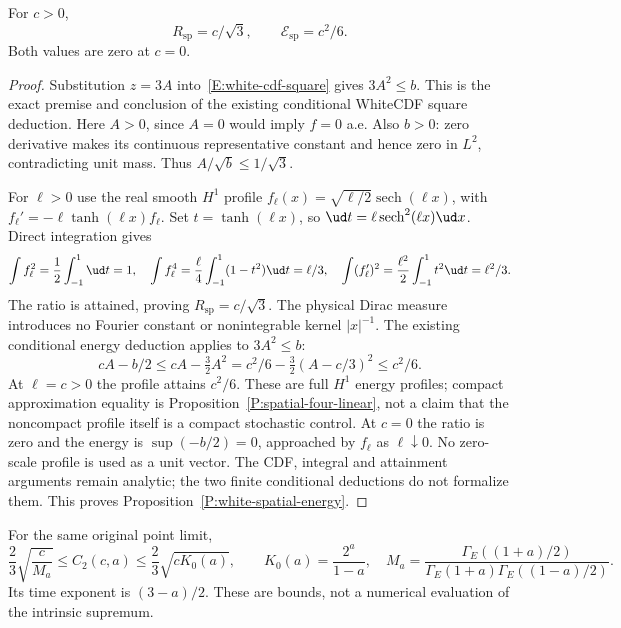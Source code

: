 \begin{proposition}\label{P:white-spatial-energy}
  For $c>0$,
  \[
    R_{\mathrm{sp}}=c/\sqrt3,\qquad
    \mathcal E_{\mathrm{sp}}=c^2/6.
  \]
  Both values are zero at $c=0$.
\end{proposition}

\begin{proof}
  Substitution $z=3A$ into~\eqref{E:white-cdf-square} gives
  $3A^2\le b$.
  This is the exact premise and conclusion of the existing conditional
  WhiteCDF square deduction.
  Here $A>0$, since $A=0$ would imply $f=0$ a.e.
  Also $b>0$: zero derivative makes its continuous representative
  constant and hence zero in $L^2$, contradicting unit mass.
  Thus $A/\sqrt b\le1/\sqrt3$.

  For $\ell>0$ use the real smooth $H^1$ profile
  $f_\ell(x)=\sqrt{\ell/2}\operatorname{sech}(\ell x)$,
  with $f_\ell'=-\ell\tanh(\ell x)f_\ell$.
  Set $t=\tanh(\ell x)$, so $\ud t=\ell\operatorname{sech}^2(\ell x)\ud x$.
  Direct integration gives
  \[
    \int f_\ell^2=\frac12\int_{-1}^1\ud t=1,\quad
    \int f_\ell^4=\frac\ell4\int_{-1}^1(1-t^2)\ud t=\ell/3,\quad
    \int(f_\ell')^2=\frac{\ell^2}2\int_{-1}^1t^2\ud t=\ell^2/3.
  \]
  The ratio is attained, proving $R_{\mathrm{sp}}=c/\sqrt3$.
  The physical Dirac measure introduces no Fourier constant or
  nonintegrable kernel $|x|^{-1}$.
  The existing conditional energy deduction applies to $3A^2\le b$:
  \[
    cA-b/2\le cA-\tfrac32A^2
    =c^2/6-\tfrac32(A-c/3)^2\le c^2/6 .
  \]
  At $\ell=c>0$ the profile attains $c^2/6$.
  These are full $H^1$ energy profiles; compact approximation equality
  is Proposition~\ref{P:spatial-four-linear}, not a claim that the
  noncompact profile itself is a compact stochastic control.
  At $c=0$ the ratio is zero and the energy is $\sup(-b/2)=0$,
  approached by $f_\ell$ as $\ell\downarrow0$.
  No zero-scale profile is used as a unit vector.
  The CDF, integral and attainment arguments remain analytic;
  the two finite conditional deductions do not formalize them.
  This proves Proposition~\ref{P:white-spatial-energy}.
\end{proof}

\begin{theorem}\label{T:white-moment-bounds}
  For the same original point limit,
  \begin{equation}\label{E:white-moment-bounds}
    \frac23\sqrt{\frac{c}{M_a}}\le C_2(c,a)
    \le\frac23\sqrt{cK_0(a)},\qquad
    K_0(a)=\frac{2^a}{1-a},\quad
    M_a=\frac{\Gamma_E((1+a)/2)}
    {\Gamma_E(1+a)\Gamma_E((1-a)/2)} .
  \end{equation}
  Its time exponent is $(3-a)/2$. These are bounds, not a numerical
  evaluation of the intrinsic supremum.
\end{theorem}

